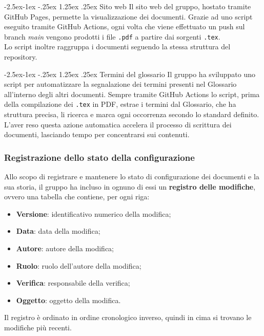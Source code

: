 \documentclass[a4paper,12pt]{article}
\makeatletter
\renewcommand\paragraph{\@startsection{paragraph}{4}{\z@}%
            {-2.5ex\@plus -1ex \@minus -.25ex}%
            {1.25ex \@plus .25ex}%
            {\normalfont\normalsize\bfseries}}
\makeatother
\begin{document}
            \paragraph{Sito web}
                Il sito web del gruppo, hostato tramite GitHub Pages, permette la visualizzazione dei documenti.
                Grazie ad uno script eseguito tramite GitHub Actions, ogni volta che viene effettuato un push sul branch \textit{main} vengono prodotti i file \verb|.pdf| a partire dai sorgenti \verb|.tex|.\\
                Lo script inoltre raggruppa i documenti seguendo la stessa struttura del repository.

            \paragraph{Termini del glossario}
                Il gruppo ha sviluppato uno script per automatizzare la segnalazione dei termini presenti nel Glossario all'interno degli altri documenti.
                Sempre tramite GitHub Actions lo script, prima della compilazione dei \verb|.tex| in PDF, estrae i termini dal Glossario, che ha struttura precisa, li ricerca e marca ogni occorrenza secondo lo standard definito.\\
                L'aver reso questa azione automatica accelera il processo di scrittura dei documenti, lasciando tempo per concentrarsi sui contenuti.

        \subsubsection{Registrazione dello stato della configurazione}
            \label{sec:regconf}
            Allo scopo di registrare e mantenere lo stato di configurazione dei documenti e la sua storia, il gruppo ha incluso in ognuno di essi un \textbf{registro delle modifiche}, ovvero una tabella che contiene, per ogni riga: 
            \begin{itemize}
                \item \textbf{Versione}: identificativo numerico della modifica;
                \item \textbf{Data}: data della modifica;
                \item \textbf{Autore}: autore della modifica;
                \item \textbf{Ruolo}: ruolo dell'autore della modifica;
                \item \textbf{Verifica}: responsabile della verifica;
                \item \textbf{Oggetto}: oggetto della modifica.
            \end{itemize}
            Il registro è ordinato in ordine cronologico inverso, quindi in cima si trovano le modifiche più recenti.
\end{document}
